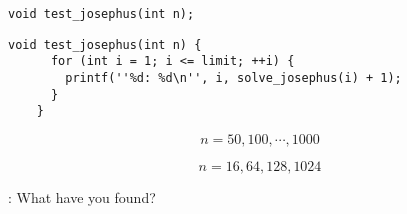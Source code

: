 \begin{frame}[fragile]{\texttt{void test\_josephus(int n);}}
  \begin{lstlisting}[style = Cstyle]
    void test_josephus(int n) {
      for (int i = 1; i <= limit; ++i) {
        printf(''%d: %d\n'', i, solve_josephus(i) + 1);
      }
    }
  \end{lstlisting}

  \pause
  \[
    n = 50, 100, \cdots, 1000 
  \]

  \[
    n = 16, 64, 128, 1024
  \]

  \vspace{0.50cm}
  \pause
  \centerline{: What have you found?}
\end{frame}


